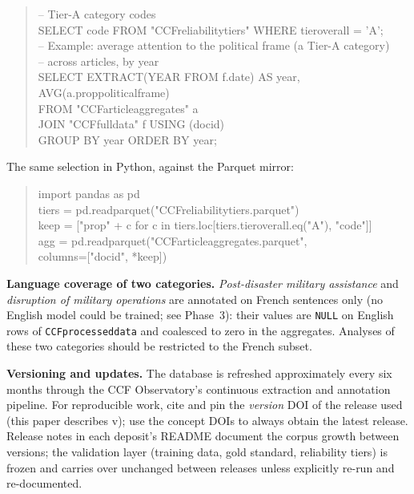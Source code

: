 \documentclass[12pt]{article}
\renewcommand\_{\texttt{\detokenize{_}\allowbreak}}
\begin{document}
\begin{quote}\ttfamily\small
-- Tier-A category codes\\
SELECT code FROM "CCF\_reliability\_tiers" WHERE tier\_overall = 'A';\\[0.4em]
-- Example: average attention to the political frame (a Tier-A category)\\
-- across articles, by year\\
SELECT EXTRACT(YEAR FROM f.date) AS year, AVG(a.prop\_political\_frame)\\
FROM "CCF\_article\_aggregates" a\\
JOIN "CCF\_full\_data" f USING (doc\_id)\\
GROUP BY year ORDER BY year;
\end{quote}

\noindent The same selection in Python, against the Parquet mirror:

\begin{quote}\ttfamily\small
import pandas as pd\\
tiers = pd.read\_parquet("CCF\_reliability\_tiers.parquet")\\
keep = ["prop\_" + c for c in tiers.loc[tiers.tier\_overall.eq("A"), "code"]]\\
agg = pd.read\_parquet("CCF\_article\_aggregates.parquet",\\
\hspace*{2em}columns=["doc\_id", *keep])
\end{quote}

\textbf{Language coverage of two categories.} \textit{Post-disaster military assistance} and \textit{disruption of military operations} are annotated on French sentences only (no English model could be trained; see Phase~3): their values are \texttt{NULL} on English rows of \texttt{CCF\_processed\_data} and coalesced to zero in the aggregates. Analyses of these two categories should be restricted to the French subset.

\textbf{Versioning and updates.} The database is refreshed approximately every six months through the CCF Observatory's continuous extraction and annotation pipeline. For reproducible work, cite and pin the \emph{version} DOI of the release used (this paper describes v\CCFversion{}); use the concept DOIs to always obtain the latest release. Release notes in each deposit's README document the corpus growth between versions; the validation layer (training data, gold standard, reliability tiers) is frozen and carries over unchanged between releases unless explicitly re-run and re-documented.
\end{document}
